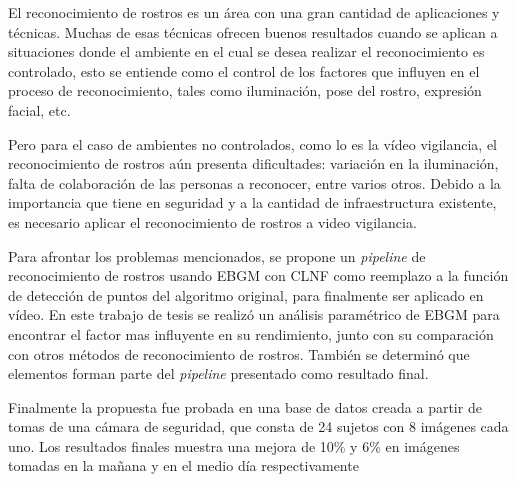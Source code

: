 \begin{resumen}

El reconocimiento de rostros es un área con una gran cantidad de aplicaciones y técnicas. 
Muchas de esas técnicas ofrecen buenos resultados cuando se aplican a situaciones donde el ambiente en el cual se desea realizar el reconocimiento es controlado, esto se entiende como el control de los factores que influyen en el proceso de reconocimiento, tales como iluminación, pose del rostro, expresión facial, etc.

Pero para el caso de ambientes no controlados, como lo es la vídeo vigilancia, el reconocimiento de rostros aún presenta dificultades: variación en la iluminación, falta de colaboración de las personas a reconocer, entre varios otros.
Debido a la importancia que tiene en seguridad y a la cantidad de infraestructura existente, es necesario aplicar el reconocimiento de rostros a video vigilancia.


Para afrontar los problemas mencionados, se propone un \textit{pipeline} de reconocimiento de rostros usando \ac{EBGM} con \ac{CLNF} como reemplazo a la función de detección de puntos del algoritmo original, para finalmente ser aplicado en vídeo. 
En este trabajo de tesis se realizó un análisis paramétrico de \ac{EBGM} para encontrar el factor mas influyente en su rendimiento, junto con su comparación con otros métodos de reconocimiento de rostros. También se determinó que elementos forman parte del \textit{pipeline} presentado como resultado final.

Finalmente la propuesta fue probada en una base de datos creada a partir de tomas de una cámara de seguridad, que consta de 24 sujetos con 8 imágenes cada uno. Los resultados finales muestra una mejora de 10\% y 6\% en imágenes tomadas en la mañana y en el medio día respectivamente



\end{resumen}